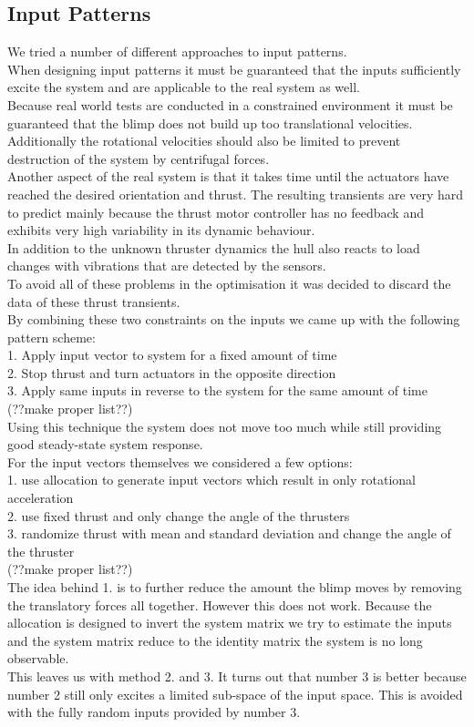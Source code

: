\subsection{Input Patterns}
\label{sub:input_pattern}
We tried a number of different approaches to input patterns. \\
When designing input patterns it must be guaranteed that the inputs sufficiently excite the system and are applicable to the real system as well.\\
Because real world tests are conducted in a constrained environment it must be guaranteed that the blimp does not build up too translational velocities.
Additionally the rotational velocities should also be limited to prevent destruction of the system by centrifugal forces. \\
Another aspect of the real system is that it takes time until the actuators have reached the desired orientation and thrust.
The resulting transients are very hard to predict mainly because the thrust motor controller has no feedback and exhibits very high variability in its dynamic behaviour. \\
In addition to the unknown thruster dynamics the hull also reacts to load changes with vibrations that are detected by the sensors. \\
To avoid all of these problems in the optimisation it was decided to discard the data of these thrust transients. \\
By combining these two constraints on the inputs we came up with the following pattern scheme: \\
1. Apply input vector to system for a fixed amount of time\\
2. Stop thrust and turn actuators in the opposite direction\\
3. Apply same inputs in reverse to the system for the same amount of time\\
(??make proper list??)\\
Using this technique the system does not move too much while still providing good steady-state system response. \\
For the input vectors themselves we considered a few options:\\
1. use allocation to generate input vectors which result in only rotational acceleration\\
2. use fixed thrust and only change the angle of the thrusters\\
3. randomize thrust with mean and standard deviation and change the angle of the thruster\\
(??make proper list??)\\
The idea behind 1. is to further reduce the amount the blimp moves by removing the translatory forces all together. 
However this does not work. Because the allocation is designed to invert the system matrix we try to estimate the inputs and the system matrix reduce to the identity matrix the system is no long observable.\\
This leaves us with method 2. and 3.
It turns out that number 3 is better because number 2 still only excites a limited sub-space of the input space. This is avoided with the fully random inputs provided by number 3.\\

